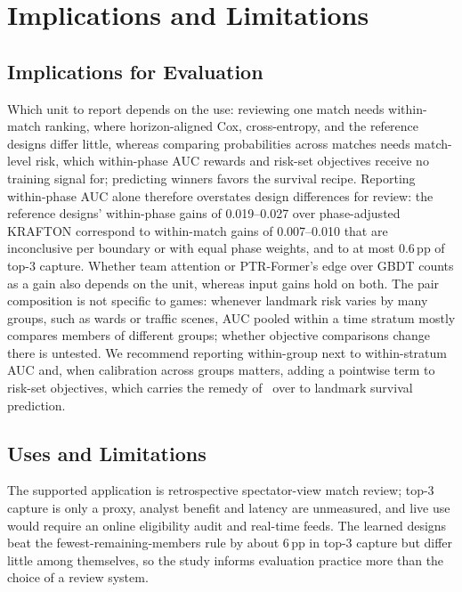 \documentclass[sigconf,anonymous,nonacm]{acmart}
\begin{document}
\section{Implications and Limitations}
\label{sec:discussion}
\subsection{Implications for Evaluation}
\label{sec:discussion:implications}
Which unit to report depends on the use: reviewing one match needs within-match ranking, where horizon-aligned Cox, cross-entropy, and the reference designs differ little, whereas comparing probabilities across matches needs match-level risk, which within-phase AUC rewards and risk-set objectives receive no training signal for; predicting winners favors the survival recipe. Reporting within-phase AUC alone therefore overstates design differences for review: the reference designs' within-phase gains of 0.019--0.027 over phase-adjusted KRAFTON correspond to within-match gains of 0.007--0.010 that are inconclusive per boundary or with equal phase weights, and to at most 0.6\,pp of top-3 capture. Whether team attention or PTR-Former's edge over GBDT counts as a gain also depends on the unit, whereas input gains hold on both. The pair composition is not specific to games: whenever landmark risk varies by many groups, such as wards or traffic scenes, AUC pooled within a time stratum mostly compares members of different groups; whether objective comparisons change there is untested. We recommend reporting within-group next to within-stratum AUC and, when calibration across groups matters, adding a pointwise term to risk-set objectives, which carries the remedy of~\cite{Bai23} over to landmark survival prediction.

\subsection{Uses and Limitations}
\label{sec:discussion:limits}
The supported application is retrospective spectator-view match review; top-3 capture is only a proxy, analyst benefit and latency are unmeasured, and live use would require an online eligibility audit and real-time feeds. The learned designs beat the fewest-remaining-members rule by about 6\,pp in top-3 capture but differ little among themselves, so the study informs evaluation practice more than the choice of a review system.
\end{document}
